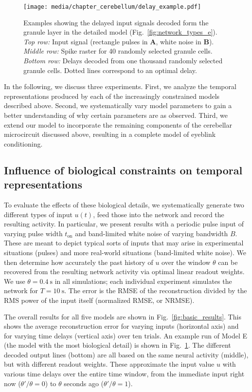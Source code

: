 \begin{figure}
	\centering
    \texttt{[image: media/chapter\_cerebellum/delay\_example.pdf]}
	\caption[Examples showing the delayed input signals decoded form the granule layer in the detailed model.]{Examples showing the delayed input signals decoded form the granule layer in the detailed model (Fig.~\ref{fig:network_types_e}). \emph{Top row:} Input signal (rectangle pulses in \textbf{A}, white noise in \textbf{B}). \emph{Middle row:} Spike raster for 40 randomly selected granule cells. \emph{Bottom row:} Delays decoded from one thousand randomly selected granule cells. Dotted lines correspond to an optimal delay.}
	\label{fig:sample_run}
\end{figure}

In the following, we discuss three experiments. First, we analyze the temporal representations produced by each of the increasingly constrained models described above. Second, we systematically vary model parameters to gain a better understanding of why certain parameters are as observed. Third, we extend our model to incorporate the remaining components of the cerebellar microcircuit discussed above, resulting in a complete model of eyeblink conditioning.

\subsection{Influence of biological constraints on temporal representations}

To evaluate the effects of these biological details, we systematically generate two different types of input $u(t)$, feed those into the network and record the resulting activity.
In particular, we present results with a periodic pulse input of varying pulse width $t_\mathrm{on}$ and band-limited white noise of varying bandwidth $B$. These are meant to depict typical sorts of inputs that may arise in experimental situations (pulses) and more real-world situations (band-limited white noise).
We then determine how accurately the past history of $u$ over the window $\theta$ can be recovered from the resulting network activity via optimal linear readout weights. We use $\theta = \SI{0.4}{\second}$ in all simulations; each individual experiment simulates the network for $T = \SI{10}{\second}$.
The error is the RMSE of the reconstruction divided by the RMS power of the input itself (normalized RMSE, or NRMSE).

The overall results for all five models are shown in Fig.~\ref{fig:basic_results}.
This shows the average reconstruction error for varying inputs (horizontal axis) and for varying time delays (vertical axis) over ten trials.
An example run of Model E (the model with the most biological detail) is shown in Fig.~\ref{fig:sample_run}.
The different decoded output lines (bottom) are all based on the same neural activity (middle), but with different readout weights.
These approximate the input value $u$ with various time delays over the entire time window, from the immediate input right now ($\theta'/\theta=0$) to $\theta$ seconds ago ($\theta'/\theta=1$).  


